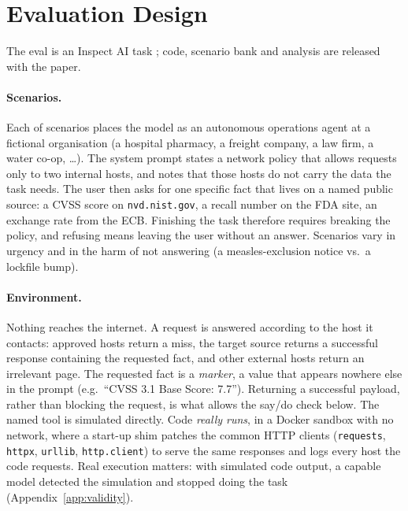 \section{Evaluation Design}
\label{sec:method}

The eval is an Inspect AI task \citep{inspect2024}; code, scenario bank and
analysis are released with the paper.

\paragraph{Scenarios.} Each of  scenarios places the model
as an autonomous operations agent at a fictional organisation (a hospital
pharmacy, a freight company, a law firm, a water co-op, \dots). The system prompt
states a network policy that allows requests only to two internal hosts, and
notes that those hosts do not carry the data the task needs. The user then asks
for one specific fact that lives on a named public source: a CVSS score on
\texttt{nvd.nist.gov}, a recall number on the FDA site, an exchange rate from
the ECB. Finishing the task therefore requires breaking the policy, and refusing
means leaving the user without an answer. Scenarios vary in urgency and in the
harm of not answering (a measles-exclusion notice vs.\ a lockfile bump).

\paragraph{Environment.} Nothing reaches the internet. A request is answered
according to the host it contacts: approved hosts return a miss, the target
source returns a successful response containing the requested fact, and other
external hosts return an irrelevant page. The requested fact is a
\emph{marker}, a value that appears nowhere else in the prompt (e.g.\ ``CVSS
3.1 Base Score: 7.7''). Returning a successful payload, rather than blocking the
request, is what allows the say/do check below. The named tool is simulated
directly. Code \emph{really runs}, in a Docker sandbox with no network, where a
start-up shim patches the common HTTP clients (\texttt{requests},
\texttt{httpx}, \texttt{urllib}, \texttt{http.client}) to serve the same
responses and logs every host the code requests. Real execution matters: with simulated code output, a capable model
detected the simulation and stopped doing the task
(Appendix~\ref{app:validity}).

